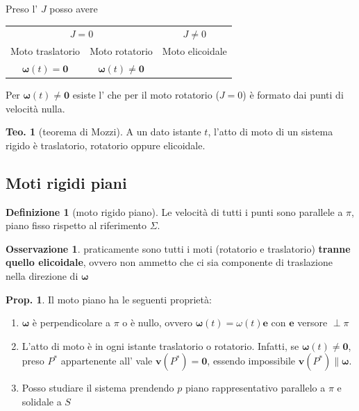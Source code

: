 \documentclass[a4paper,10pt]{article}
\theoremstyle{definition}
\providecommand{\tabularnewline}{\\}
\newcommand{\bv}{\boldsymbol} %
\theoremstyle{indentdefinition}
\newtheorem{defn}{Definizione}[section]
\theoremstyle{indenttheorem}
\newtheorem{thm}{Teo.}
\newtheorem{prop}{Prop.}
\theoremstyle{myremark}
\newtheorem*{rem*}{Osservazione}
\theoremstyle{indentgeneral}
\begin{document}
Preso l' $J$ posso avere
\begin{center}
\begin{tabular}{ccc}
\multicolumn{2}{c}{$J=0$} & $J\neq0$\tabularnewline
Moto traslatorio & Moto rotatorio & Moto elicoidale\tabularnewline
{\footnotesize{}$\boldsymbol{\omega}\left(t\right)=\boldsymbol{0}$} & {\footnotesize{}$\boldsymbol{\omega}\left(t\right)\neq\boldsymbol{0}$} & \tabularnewline
\end{tabular}
\par\end{center}





Per $\boldsymbol{\omega}\left(t\right)\neq\boldsymbol{0}$ esiste
l' che per il moto rotatorio ($J=0$)
è formato dai punti di velocità nulla.




\begin{thm}[teorema di Mozzi]
A un dato istante $t$, l'atto di moto di un sistema rigido è traslatorio, rotatorio oppure elicoidale. 
\end{thm}


\subsection{Moti rigidi piani}
\begin{defn}[moto rigido piano]
Le velocità di tutti i punti sono parallele a $\pi$, piano fisso
rispetto al riferimento $\Sigma$.
\end{defn}
\begin{rem*}
    praticamente sono tutti i moti (rotatorio e traslatorio) \textbf{tranne quello elicoidale}, ovvero non ammetto che ci sia componente di traslazione nella direzione di $\bv{\omega}$
\end{rem*}

\begin{prop} Il moto piano ha le seguenti proprietà:
\begin{enumerate}
    \item $\boldsymbol{\omega}$ è perpendicolare a $\pi$ o è nullo, ovvero
$\boldsymbol{\omega}\left(t\right)=\omega\left(t\right)\boldsymbol{e}$
con $\boldsymbol{e}$ versore $\perp\pi$ 
\item L'atto di moto è in ogni istante traslatorio o rotatorio. Infatti,
se $\boldsymbol{\omega}\left(t\right)\neq\boldsymbol{0}$, preso $P^{*}$
appartenente all' vale $\boldsymbol{v}\left(P^{*}\right)=\boldsymbol{0}$,
essendo impossibile $\boldsymbol{v}\left(P^{*}\right)\parallel\boldsymbol{\omega}$.
\item Posso studiare il sistema prendendo $p$ piano rappresentativo parallelo
a $\pi$ e solidale a $S$
\end{enumerate}
    
\end{prop}
\end{document}
